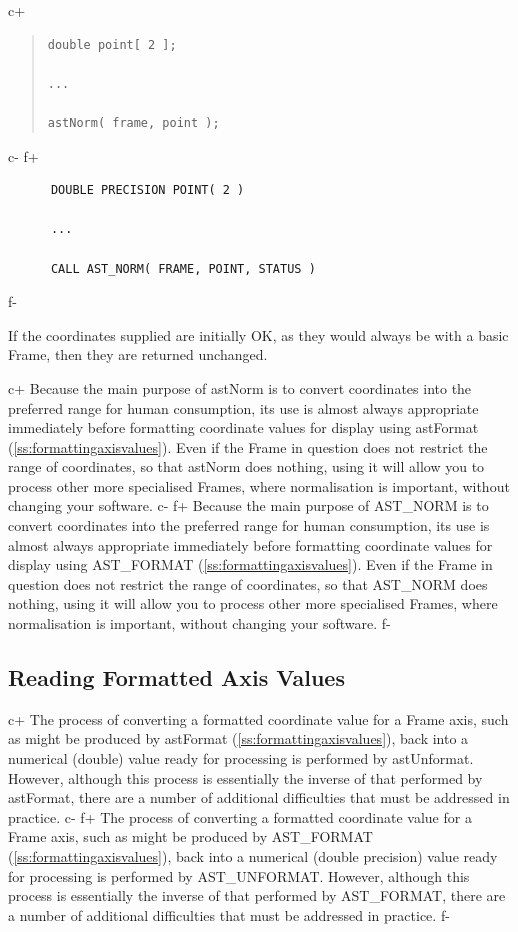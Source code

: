 \documentclass[twoside,11pt]{article}
\newcommand{\secref}[1]{\S\ref{#1}}
\renewcommand{\secref}[1]{\ref{#1}}
\begin{document}
c+
\begin{quote}
\small
\begin{verbatim}
double point[ 2 ];

...

astNorm( frame, point );
\end{verbatim}
\normalsize
\end{quote}
c-
f+
\small
\begin{verbatim}
      DOUBLE PRECISION POINT( 2 )

      ...

      CALL AST_NORM( FRAME, POINT, STATUS )
\end{verbatim}
\normalsize
f-

If the coordinates supplied are initially OK, as they would always be
with a basic Frame, then they are returned unchanged.

c+
Because the main purpose of astNorm is to convert coordinates into the
preferred range for human consumption, its use is almost always
appropriate immediately before formatting coordinate values for
display using astFormat (\secref{ss:formattingaxisvalues}). Even if
the Frame in question does not restrict the range of coordinates, so
that astNorm does nothing, using it will allow you to process other
more specialised Frames, where normalisation is important, without
changing your software.
c-
f+
Because the main purpose of AST\_NORM is to convert coordinates into
the preferred range for human consumption, its use is almost always
appropriate immediately before formatting coordinate values for
display using AST\_FORMAT (\secref{ss:formattingaxisvalues}). Even if
the Frame in question does not restrict the range of coordinates, so
that AST\_NORM does nothing, using it will allow you to process other
more specialised Frames, where normalisation is important, without
changing your software.
f-

\subsection{\label{ss:unformattingaxisvalues}Reading Formatted Axis Values}

c+
The process of converting a formatted coordinate value for a Frame
axis, such as might be produced by astFormat
(\secref{ss:formattingaxisvalues}), back into a numerical (double)
value ready for processing is performed by astUnformat.  However,
although this process is essentially the inverse of that performed by
astFormat, there are a number of additional difficulties that must be
addressed in practice.
c-
f+
The process of converting a formatted coordinate value for a Frame
axis, such as might be produced by AST\_FORMAT
(\secref{ss:formattingaxisvalues}), back into a numerical (double
precision) value ready for processing is performed by AST\_UNFORMAT.
However, although this process is essentially the inverse of that
performed by AST\_FORMAT, there are a number of additional difficulties
that must be addressed in practice.
f-
\end{document}
